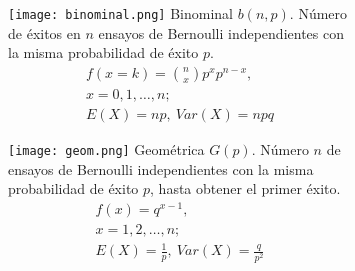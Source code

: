 \begin{figure}[H]\caption[Distribuciones]{Existe diversidad de distribuciones para modelar v.a.s, a continuación se muestran las mas importantes de acuerdo a Balakrisnan, Koutras y Politis\cite{bala20}, siendo aptas para v.a.d.s hasta la distribución Normal, mientras que las v.a.c.s pueden ser modeladas a partir de la distribución Uniforme.}\label{FIG:DISTS}
\begin{subfigure}[t]{.475\textwidth}\texttt{[image: binominal.png]}
Binominal $b(n,p)$. Número de éxitos en $n$ ensayos de Bernoulli independientes con la misma probabilidad de éxito $p$.
\begin{equation}\begin{matrix}
f(x=k)=\binom{n}{x}p^xp^{n-x},\\
x=0,1,\ldots,n;\\
E(X)=np,\ Var(X)=npq
\end{matrix}\end{equation}\end{subfigure}\qquad
\begin{subfigure}[t]{.475\textwidth}\texttt{[image: geom.png]}
Geométrica $G(p)$.
Número $n$ de ensayos de Bernoulli independientes con la misma probabilidad de éxito $p$, hasta obtener el primer éxito.
\begin{equation}\begin{matrix}
f(x)=q^{x-1},\\
x=1,2,\ldots,n;\\
E(X)=\frac{1}{p},\ Var(X)=\frac{q}{p^2}
\end{matrix}\end{equation}\end{subfigure}
\end{figure}


